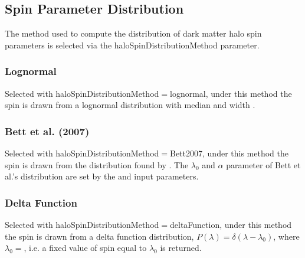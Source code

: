 \subsection{Spin Parameter Distribution}\label{sec:SpinParameterDistribution}

The method used to compute the distribution of dark matter halo spin parameters is selected via the {\normalfont \ttfamily haloSpinDistributionMethod} parameter.

\subsubsection{Lognormal}\label{phys:haloSpinDistribution:haloSpinDistributionLogNormal}

Selected with {\normalfont \ttfamily haloSpinDistributionMethod}$=${\normalfont \ttfamily lognormal}, under this method the spin is drawn from a lognormal distribution with median {\normalfont \ttfamily [lognormalSpinDistributionMedian]} and width {\normalfont \ttfamily [lognormalSpinDistributionSigma]}.

\subsubsection{Bett et al. (2007)}\label{phys:haloSpinDistribution:haloSpinDistributionBett2007}

Selected with {\normalfont \ttfamily haloSpinDistributionMethod}$=${\normalfont \ttfamily Bett2007}, under this method the spin is drawn from the distribution found by \cite{bett_spin_2007}. The $\lambda_0$ and $\alpha$ parameter of Bett et al.'s distribution are set by the {\normalfont {}} and {\normalfont {}} input parameters.

\subsubsection{Delta Function}\label{phys:haloSpinDistribution:haloSpinDistributionDeltaFunction}

Selected with {\normalfont \ttfamily haloSpinDistributionMethod}$=${\normalfont \ttfamily deltaFunction}, under this method the spin is drawn from a delta function distribution, $P(\lambda) = \delta(\lambda-\lambda_0)$, where $\lambda_0=${\normalfont \ttfamily [deltaFunctionSpinDistributionSpin]}, i.e. a fixed value of spin equal to $\lambda_0$ is returned.

